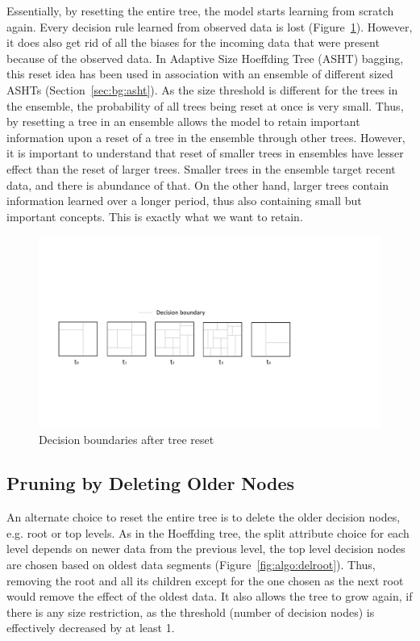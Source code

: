 Essentially, by resetting the entire tree, the model starts learning from scratch again. Every decision rule learned from observed data is lost (Figure~\ref{fig:algo:resetdb}). However, it does also get rid of all the biases for the incoming data that were present because of the observed data. In Adaptive Size Hoeffding Tree (ASHT) bagging, this reset idea has been used in association with an ensemble of different sized ASHTs (Section~\ref{sec:bg:asht}). As the size threshold is different for the trees in the ensemble, the probability of all trees being reset at once is very small. Thus, by  resetting a tree  in an ensemble allows the model to retain important information upon a reset of a tree in the ensemble through other trees. However, it is important to understand that reset of smaller trees in ensembles have lesser effect than the reset of larger trees. Smaller trees in the ensemble target recent data, and there is abundance of that. On the other hand, larger trees contain information learned over a longer period, thus also containing small but important concepts. This is exactly what we want to retain.

\begin{figure}[htbp]
    \begin{center}
        \includegraphics[width=14.0cm]{figs/resetdb.pdf}
        \caption{Decision boundaries after tree reset}
        \label{fig:algo:resetdb}
    \end{center}
\end{figure}

\subsection{Pruning by Deleting Older Nodes}
An alternate choice to reset the entire tree is to delete the older decision nodes, e.g. root or top levels. As in the Hoeffding tree, the split attribute choice for each level depends on newer data from the previous level, the top level decision nodes are chosen based on oldest data segments (Figure~\ref{fig:algo:delroot}). Thus, removing the root and all its children except for the one chosen as the next root would remove the effect of the oldest data. It also allows the tree to grow again, if there is any size restriction, as the threshold (number of decision nodes) is effectively decreased by at least 1.

